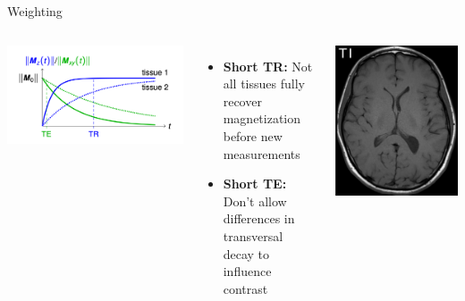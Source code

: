 \begin{frame}{\longtime{} Weighting}

    \begin{columns}[t,onlytextwidth]
        \includegraphics[height=0.6\textheight]{images/weighting_t1}

        \begin{itemize}
            \item \textbf{Short TR:} Not all tissues fully recover magnetization before new measurements
            \item \textbf{Short TE:} Don't allow differences in transversal decay to influence contrast
        \end{itemize}

        \includegraphics[height=0.6\textheight]{images/t1}


\end{columns}
\end{frame}
